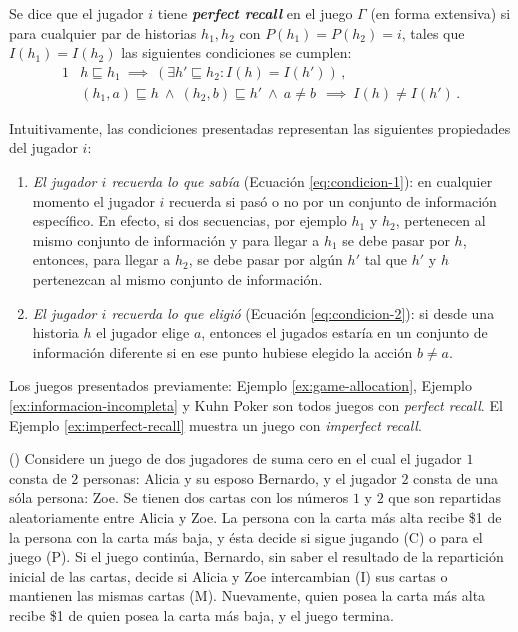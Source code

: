\begin{definition}
\label{def:perfect-recall}
Se dice que el jugador $i$ tiene \textbf{\textit{perfect recall}} en el juego $\Gamma$ (en forma extensiva) si para cualquier par de historias $h_1, h_2$ con $P(h_1) = P(h_2) = i$, tales que $I(h_1) = I(h_2)$ las siguientes condiciones se cumplen:
\begin{alignat}{1}
& h \sqsubseteq h_1\ \implies\ (\exists h' \sqsubseteq h_2 : I(h) = I(h')) \,,
\label{eq:condicion-1}\\
& (h_1, a) \sqsubseteq h\  \land\ (h_2, b)\sqsubseteq h'\ \land\ a \neq b\ \  \implies\ I(h) \neq I(h') \,.
\label{eq:condicion-2}
\end{alignat}
\end{definition}

Intuitivamente, las condiciones presentadas representan las siguientes propiedades del jugador $i$:
\begin{enumerate}[noitemsep]
\item \textit{El jugador $i$ recuerda lo que sabía} (Ecuación \ref{eq:condicion-1}): en cualquier momento el jugador $i$ recuerda si pasó o no por un conjunto de información específico. En efecto, si dos secuencias, por ejemplo $h_1$ y $h_2$, pertenecen al mismo conjunto de información y para llegar a $h_1$ se debe pasar por $h$, entonces, para llegar a $h_2$, se debe pasar por algún $h'$ tal que $h'$ y $h$ pertenezcan al mismo conjunto de información. 

\item \textit{El jugador $i$ recuerda lo que eligió} (Ecuación \ref{eq:condicion-2}): si desde una historia $h$ el jugador elige $a$, entonces el jugados estaría  en un conjunto de información diferente si en ese punto hubiese elegido la acción $b \neq a$.
\end{enumerate}

Los juegos presentados previamente: Ejemplo \ref{ex:game-allocation}, Ejemplo \ref{ex:informacion-incompleta} y Kuhn Poker son todos juegos con \textit{perfect recall}. El Ejemplo \ref{ex:imperfect-recall} muestra un juego con \textit{imperfect recall}.

\begin{example} (\cite{bib:kuhn-problem-information})
\label{ex:imperfect-recall}
Considere un juego de dos jugadores de suma cero en el cual el jugador $1$ consta de $2$ personas: Alicia y su esposo Bernardo, y el jugador $2$ consta de una sóla persona: Zoe. Se tienen dos cartas con los números $1$ y $2$ que son repartidas aleatoriamente entre Alicia y Zoe. La persona con la carta más alta recibe \$1 de la persona con la carta más baja, y ésta decide si sigue jugando (C) o para el juego (P). Si el juego continúa, Bernardo, sin saber el resultado de la repartición inicial de las cartas, decide si Alicia y Zoe intercambian (I) sus cartas o mantienen las mismas cartas (M). Nuevamente, quien posea la carta más alta recibe \$1 de quien posea la carta más baja, y el juego termina.
\end{example}

